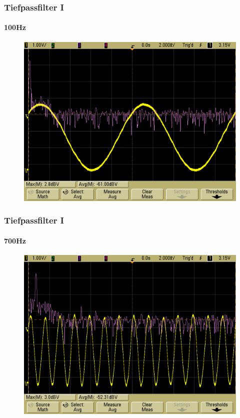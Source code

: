 \begin{frame}
    \frametitle{Tiefpassfilter I}
    \framesubtitle{100Hz}
    \begin{figure}[H]
    \begin{center}
            \includegraphics[scale=0.15]{./img/oszi/scope_30.png}
    \end{center}
    \end{figure}  
\end{frame}
\begin{frame}
    \frametitle{Tiefpassfilter I}
    \framesubtitle{700Hz}
    \begin{figure}[H]
    \begin{center}
            \includegraphics[scale=0.15]{./img/oszi/scope_31.png}
    \end{center}
    \end{figure}  
\end{frame}
